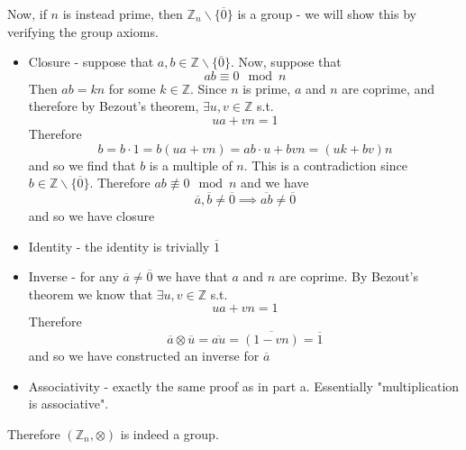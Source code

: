 \documentclass{article}
\newcommand{\chapternumber}{2}
\newenvironment{QandA}{\begin{enumerate}[label=\chapternumber.\arabic*]\bfseries\boldmath}
	{\end{enumerate}}
\newenvironment{answered}{\par\bigskip\normalfont\unboldmath}{}
\begin{document}
\begin{QandA}
\begin{answered}
			Now, if $n$ is instead prime, then $\mathbb{Z}_n\backslash\{\overline{0}\}$ is a group - we will show this by verifying the group axioms.
			\begin{itemize}
				\item Closure - suppose that $a,b\in\mathbb{Z}\backslash\{\overline{0}\}$. Now, suppose that
				\[ab\equiv 0 \mod{n}\]
				Then $ab=kn$ for some $k\in \mathbb{Z}$. Since $n$ is prime, $a$ and $n$ are coprime, and therefore by Bezout's theorem, $\exists u,v\in\mathbb{Z}$ s.t.
				\[ua+vn=1\]
				Therefore
				\[b = b\cdot 1 = b(ua+vn) = ab\cdot u + bvn = (uk+bv)n\]
				and so we find that $b$ is a multiple of $n$. This is a contradiction since $b\in\mathbb{Z}\backslash\{\overline{0}\}$. Therefore $ab\not\equiv 0 \mod{n}$ and we have 
				\[\overline{a},\overline{b}\neq\overline{0}\implies\overline{ab}\neq\overline{0}\]
				and so we have closure
				\item Identity - the identity is trivially $\overline{1}$
				\item Inverse - for any $\overline{a}\neq\overline{0}$ we have that $a$ and $n$ are coprime. By Bezout's theorem we know that $\exists u,v\in\mathbb{Z}$ s.t.
				\[ua+vn=1\]
				Therefore
				\[\overline{a}\otimes\overline{u}=\overline{au}=\overline{(1-vn)}=\overline{1}\]
				and so we have constructed an inverse for $\overline{a}$
				\item Associativity - exactly the same proof as in part a. Essentially "multiplication is associative".
			\end{itemize}
			Therefore $(\mathbb{Z}_n,\otimes)$ is indeed a group.
		\end{answered}
	\end{QandA}
\end{document}
